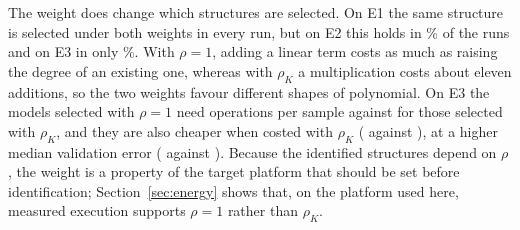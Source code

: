 The weight does change which structures are selected. On E1 the same structure is selected under both weights in every
run, but on E2 this holds in \RhoECSame\% of the runs and on E3 in only \RhoEDSame\%. With $\rho=1$, adding a linear term
costs as much as raising the degree of an existing one, whereas with $\rho_K$ a multiplication costs about eleven
additions, so the two weights favour different shapes of polynomial. On E3 the models selected with $\rho=1$ need
\RhoEDOneGreenOps{} operations per sample against \RhoEDKaraGreenOps{} for those selected with $\rho_K$, and they are also
cheaper when costed with $\rho_K$ (\RhoEDOneGreenKar{} against \RhoEDKaraGreenKar), at a higher median validation error
(\EDGreenVALsel{} against \KaraEDGreenVALsel). Because the identified structures depend on $\rho$, the weight is a
property of the target platform that should be set before identification; Section~\ref{sec:energy} shows that, on the
platform used here, measured execution supports $\rho=1$ rather than $\rho_K$.


